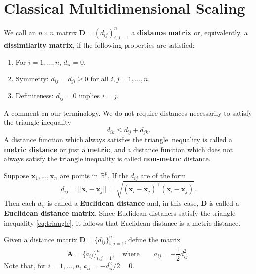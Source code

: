 \documentclass[]{book}
\providecommand{\tightlist}{%
  \setlength{\itemsep}{0pt}\setlength{\parskip}{0pt}}
\theoremstyle{definition}
\theoremstyle{definition}
\theoremstyle{definition}
\theoremstyle{remark}
\begin{document}
\hypertarget{classical-multidimensional-scaling}{%
\section{Classical Multidimensional Scaling}\label{classical-multidimensional-scaling}}

We call an \(n \times n\) matrix \(\boldsymbol D=(d_{ij})_{i,j=1}^n\) a \textbf{distance matrix} or, equivalently, a \textbf{dissimilarity matrix}, if the following properties are satisfied:

\begin{enumerate}
\def\labelenumi{\arabic{enumi}.}
\tightlist
\item
  For \(i=1, \ldots , n\), \(d_{ii}=0\).
\item
  Symmetry: \(d_{ij}=d_{ji} \geq 0\) for all \(i,j=1,\ldots, n\).
\item
  Definiteness: \(d_{ij}=0\) implies \(i=j\).
\end{enumerate}

A comment on our terminology. We do not require distances necessarily to satisfy the triangle inequality
\begin{equation}
d_{ik} \leq d_{ij}+d_{jk}.
\label{eq:triangle}
\end{equation}
A distance function which always satisfies the triangle inequality is called a \textbf{metric distance}
or just a \textbf{metric}, and a distance function which does not always satisfy the triangle inequality is called
\textbf{non-metric} distance.

Suppose \(\boldsymbol x_1,\ldots , \boldsymbol x_n\) are points in \(\mathbb{R}^p\). If the \(d_{ij}\) are of the form
\[
d_{ij}=\vert \vert \boldsymbol x_i -\boldsymbol x_j \vert \vert =\sqrt{(\boldsymbol x_i-\boldsymbol x_j)^\top (\boldsymbol x_i-\boldsymbol x_j)}.
\]
Then each \(d_{ij}\) is called a \textbf{Euclidean distance} and, in this case, \(\boldsymbol D\) is called a \textbf{Euclidean distance matrix}. Since Euclidean distances satisfy the triangle
inequality \eqref{eq:triangle}, it follows that Euclidean distance is a metric distance.

Given a distance matrix \({\mathbf D}=\{d_{ij}\}_{i,j=1}^n\), define the matrix
\begin{equation}
\boldsymbol A=\{a_{ij}\}_{i,j=1}^n,  \quad \text{where} \qquad a_{ij}=-\frac{1}{2}d_{ij}^2.
\label{eq:defA}
\end{equation}
Note that, for \(i=1,\ldots , n\), \(a_{ii}=-d_{ii}^2/2=0\).
\end{document}
